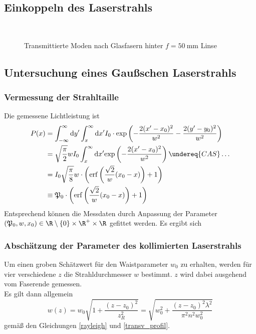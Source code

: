 \documentclass[11pt,a4paper,oneside]{scrartcl}
\begin{document}
\subsection{Einkoppeln des Laserstrahls}
\begin{figure}[H]
\setcounter{imEnv}{1}
    \centering
  \\
   \caption{Transmittierte Moden nach Glasfasern hinter $f=50\ \mathrm{mm}$ Linse}
    \label{FotostreckeGlasfasern}
\end{figure}
\subsection{Untersuchung eines Gaußschen Laserstrahls}

\subsubsection{Vermessung der Strahltaille}
Die gemessene Lichtleistung ist 
\begin{align}
P(x)&=\int_{-\infty}^\infty \mathrm dy^\prime \int_x^\infty \mathrm dx^\prime I_0\cdot\mathrm{exp}\left(-\frac{2(x^\prime-x_0)^2}{w^2}-\frac{2(y^\prime-y_0)^2}{w^2}\right) \\ \quad& = \sqrt{\frac{\pi}{2}}wI_0\int_x^\infty \mathrm dx^\prime \mathrm{exp}\left(-\frac{2(x^\prime-x_0)^2}{w^2}\right) \undereq{CAS}\hdots \\ \quad& =I_0\sqrt{\frac{\pi}{8}}w\cdot\left(\mathrm{erf}\left(\frac{\sqrt{2}}{w}(x_0-x)\right)+1\right)\\ \quad& \equiv \mathfrak{P}_0\cdot\left(\mathrm{erf}\left(\frac{\sqrt{2}}{w}(x_0-x)\right)+1\right)
\end{align}
Entsprechend können die Messdaten durch Anpassung der Parameter $(\mathfrak P_0,w,x_0)\in \R\setminus\{0\}\times\R^+\times\R$ gefittet werden.
Es ergibt sich 
\subsubsection{Abschätzung der Parameter des kollimierten Laserstrahls}
Um einen groben Schätzwert für den Waistparameter $w_0$ zu erhalten, werden für vier verschiedene $z$ die Strahldurchmesser $w$ bestimmt. $z$ wird dabei ausgehend vom Faserende gemessen. \\
Es gilt dann allgemein
\begin{equation}\label{w(z)}
w(z)=w_0\sqrt{1+\frac{(z-z_0)^2}{z_R^2}}=\sqrt{w_0^2+\frac{(z-z_0)^2\lambda^2}{\pi^2n^2w_0^2}}
\end{equation}
gemäß den Gleichungen \ref{rayleigh} und \ref{transv_profil}. 
\end{document}
